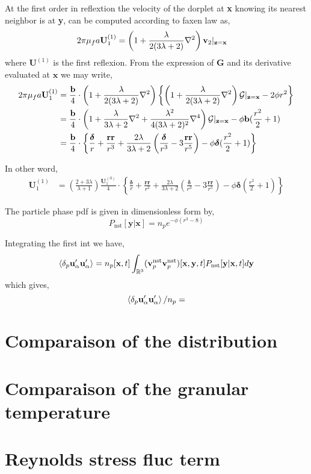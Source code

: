 At the first order in reflextion the velocity of the dorplet at \textbf{x} knowing its nearest neighbor is at \textbf{y}, can be computed according to faxen law as, 
\begin{align}
    2 \pi \mu_f a \textbf{U}_1^{(1)}
    &= \left(1 + \frac{\lambda}{2(3\lambda +2)}\mathbf{\nabla}^2\right)\textbf{v}_2|_{\textbf{z} = \textbf{x}}
\end{align}
where $\textbf{U}^{(1)}$ is the first reflexion. 
From the expression of $\mathbf{G}$ and its derivative evaluated at $\textbf{x}$ we may write, 
\begin{align}
    2 \pi \mu_f a \textbf{U}_1^{(1)}
    &= 
    \frac{\textbf{b}}{4}\cdot\left(1+ \frac{\lambda}{2(3\lambda +2)}\mathbf{\nabla}^2\right) \left\{\left(1 + \frac{\lambda}{2(3\lambda +2)}\mathbf{\nabla}^2\right)\mathcal{G}|_{\textbf{z} = \textbf{x}}  - 2 \phi r^2 \right\} \\
    &= 
    \frac{\textbf{b}}{4}\cdot\left(1+ \frac{\lambda}{3\lambda +2}\mathbf{\nabla}^2+ \frac{\lambda^2}{4(3\lambda +2)^2}\mathbf{\nabla}^4\right)\mathcal{G}|_{\textbf{z} = \textbf{x}}
    - \phi \textbf{b} (\frac{r^2}{2} +1 )\\
    &=\frac{\textbf{b}}{4}\cdot\left\{ \frac{\bm\delta}{r}+ \frac{\textbf{rr}}{r^3}+ \frac{2\lambda}{3\lambda +2} \left(
        \frac{\bm\delta}{r^3} - 3 \frac{\textbf{rr}}{r^5}
    \right)
    - \phi \bm\delta (\frac{r^2}{2} +1 )
    \right\}
\end{align}

In other word, 
\begin{align}
    \textbf{U}_1^{(1)}
    &=\left(\frac{2+3\lambda}{\lambda +1}\right)\frac{    \textbf{U}_1^{(0)}    }{4}\cdot\left\{ \frac{\bm\delta}{r}+ \frac{\textbf{rr}}{r^3}+ \frac{2\lambda}{3\lambda +2} \left(
        \frac{\bm\delta}{r^3} - 3 \frac{\textbf{rr}}{r^5}
    \right)
    - \phi \bm\delta (\frac{r^2}{2} +1 )
    \right\}
\end{align}




The particle phase pdf is given in dimensionless form by, 
\begin{equation*}
    P_\text{nst}[\textbf{y}|\textbf{x}]
    =
    n_p e^{- \phi (r^3 - 8)}
\end{equation*}

Integrating the first int we have, 
\begin{equation*}
    \left<\delta_{p} \textbf{u}_\alpha'\textbf{u}_\alpha'\right>
    = 
    n_p[\textbf{x},t]
    \int_{\mathbb{R}^3}
    (\textbf{v}^\text{nst}_p
    \textbf{v}^\text{nst}_p)[\textbf{x},\textbf{y},t]
    P_\text{nst}[\textbf{y}|\textbf{x},t]
    d\textbf{y}
\end{equation*}
which gives, 
\begin{equation*}
    \left<\delta_{p} \textbf{u}_\alpha'\textbf{u}_\alpha'\right> / n_p 
    = 
\end{equation*}


\section*{Comparaison of the distribution}
\section*{Comparaison of the granular temperature}

\section*{Reynolds stress fluc term}
